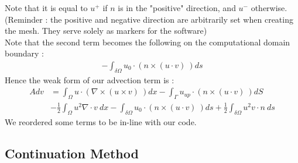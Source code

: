 \documentclass[11pt,twoside,a4paper]{article}
\begin{document}
Note that it is equal to $u^+$ if $n$ is in the "positive" direction, and $u^-$ otherwise. (Reminder : the positive and negative direction are arbitrarily set when creating the mesh. They serve solely as markers for the software)\\
Note that the second term becomes the following on the computational domain boundary :
\begin{align*}
- \int_{\delta \Omega} u_0 \cdot (n \times (u \cdot v) \ ) ds
\end{align*}
Hence the weak form of our advection term is :
\begin{align}
 Adv &= \int_\Omega u \cdot (\nabla \times (u \times v) \ ) dx - \int_{\Gamma} u_{up} \cdot (n \times (u \cdot v) \ ) dS \\
&- \frac{1}{2} \int_\Omega u^2 \nabla \cdot v \ dx - \int_{\delta \Omega} u_0 \cdot (n \times (u \cdot v) \ ) ds
+ \frac{1}{2} \int_{\delta \Omega } u^2 v \cdot n \ ds
\end{align}
We reordered some terms to be in-line with our code.

\subsection{Continuation Method}
\end{document}
